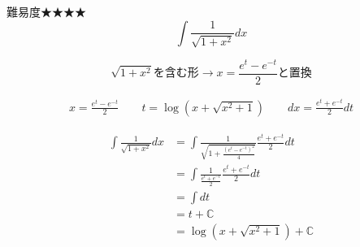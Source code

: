 \documentclass[main]{subfiles}
\begin{document}

\begin{mondai}{難易度★★★★}{}
    $$\int \frac{1}{\sqrt{1+x^2}} dx$$
    
    \tcblower

    \begin{pointbox}
        \begin{center}
        $$\sqrt{1+x^2}\text{を含む形}\rightarrow x=\frac{e^t-e^{-t}}{2} \text{と置換}$$
        \end{center}
    \end{pointbox}

    \begin{tcolorbox}
        \begin{align*}
            x=\frac{e^t-e^{-t}}{2} \qquad
            t=\log \left(x+\sqrt{x^2+1}\right) \qquad 
            dx=\frac{e^t+e^{-t}}{2}dt
        \end{align*}
    \end{tcolorbox}
    \begin{align*}
        \int \frac{1}{\sqrt{1+x^2}} dx
            &= \int \frac{1}{\sqrt{1+\frac{\left(e^t-e^{-t}\right)^2}{4}}} \frac{e^t+e^{-t}}{2}dt \\
            &= \int \frac{1}{\frac{e^t+e^{-t}}{2}}\frac{e^t+e^{-t}}{2} dt \\
            &= \int dt \\
            &= t+\mathbb{C} \\
            &= \log \left(x+\sqrt{x^2+1}\right)+\mathbb{C} \tag{答}
    \end{align*}

\end{mondai}
\end{document}
